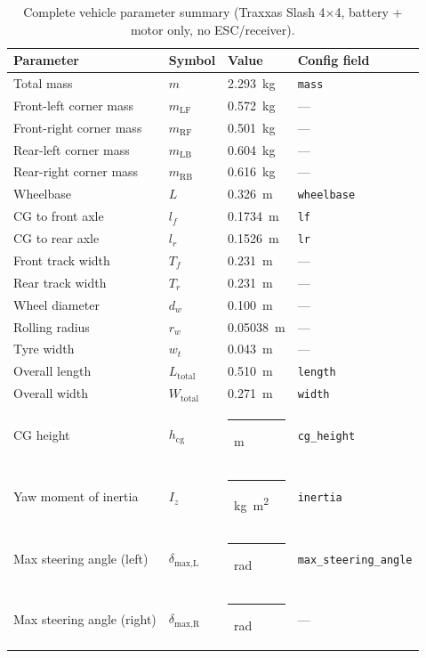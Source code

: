 \documentclass[a4paper,11pt]{article}
\newcommand{\param}[1]{\texttt{#1}}
\begin{document}
\begin{table}[H]
\centering
\caption{Complete vehicle parameter summary (Traxxas Slash 4$\times$4,
battery + motor only, no ESC/receiver).}
\label{tab:summary}
\begin{tabular}{@{}llll@{}}
\toprule
\textbf{Parameter} & \textbf{Symbol} & \textbf{Value}
  & \textbf{Config field}\\
\midrule
Total mass                & $m$            & \SI{2.293}{\kilo\gram}
  & \param{mass}\\
Front-left corner mass    & $m_\text{LF}$  & \SI{0.572}{\kilo\gram}
  & —\\
Front-right corner mass   & $m_\text{RF}$  & \SI{0.501}{\kilo\gram}
  & —\\
Rear-left corner mass     & $m_\text{LB}$  & \SI{0.604}{\kilo\gram}
  & —\\
Rear-right corner mass    & $m_\text{RB}$  & \SI{0.616}{\kilo\gram}
  & —\\
\midrule
Wheelbase                 & $L$            & \SI{0.326}{\metre}
  & \param{wheelbase}\\
CG to front axle          & $l_f$          & \SI{0.1734}{\metre}
  & \param{lf}\\
CG to rear axle           & $l_r$          & \SI{0.1526}{\metre}
  & \param{lr}\\
Front track width         & $T_f$          & \SI{0.231}{\metre}
  & —\\
Rear track width          & $T_r$          & \SI{0.231}{\metre}
  & —\\
\midrule
Wheel diameter            & $d_w$          & \SI{0.100}{\metre}
  & —\\
Rolling radius            & $r_w$          & \SI{0.05038}{\metre}
  & —\\
Tyre width                & $w_t$          & \SI{0.043}{\metre}
  & —\\
\midrule
Overall length            & $L_\text{total}$  & \SI{0.510}{\metre}
  & \param{length}\\
Overall width             & $W_\text{total}$  & \SI{0.271}{\metre}
  & \param{width}\\
CG height                 & $h_\text{cg}$     & \rule{2cm}{0.4pt}~\si{\metre}
  & \param{cg\_height}\\
Yaw moment of inertia     & $I_z$             & \rule{2cm}{0.4pt}~\si{\kilo\gram\metre\squared}
  & \param{inertia}\\
\midrule
Max steering angle (left)  & $\delta_\text{max,L}$ & \rule{2cm}{0.4pt}~\si{\radian}
  & \param{max\_steering\_angle}\\
Max steering angle (right) & $\delta_\text{max,R}$ & \rule{2cm}{0.4pt}~\si{\radian}
  & —\\
\bottomrule
\end{tabular}
\end{table}
\end{document}
